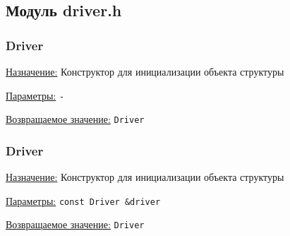 \subsection{Модуль driver.h}


\subsubsection{Driver}

\underline{Назначение:} Конструктор для инициализации объекта структуры

\underline{Параметры:} \verb|-|

\underline{Возвращаемое значение:} \verb|Driver|


\subsubsection{Driver}

\underline{Назначение:} Конструктор для инициализации объекта структуры

\underline{Параметры:} \verb|const Driver &driver|

\underline{Возвращаемое значение:} \verb|Driver|

